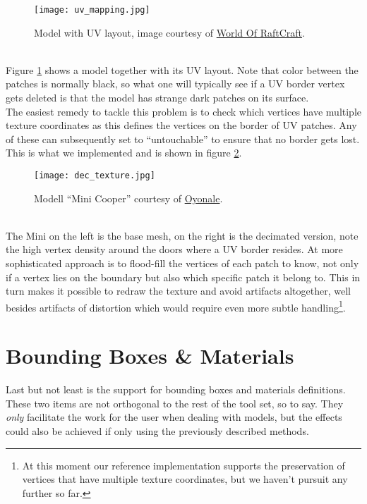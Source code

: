 \begin{figure}[htb]
\center
\texttt{[image: uv\_mapping.jpg]}
\caption{Model with UV layout, image courtesy of \href{http://blogs.gscept.com/2008/sg2/index.php/page/2/index.html}{World Of RaftCraft}.}
\label{fig:uv_mapping}
\end{figure}\\
Figure \ref{fig:uv_mapping} shows a model together with its UV layout.
Note that color between the patches is normally black, so what one will typically see if a UV border vertex gets deleted is that the model has strange dark patches on its surface.\\
The easiest remedy to tackle this problem is to check which vertices have multiple texture coordinates as this defines the vertices on the border of UV patches.
Any of these can subsequently set to ``untouchable'' to ensure that no border gets lost.
This is what we implemented and is shown in figure \ref{fig:dec_texture}.
\begin{figure}[htb]
\center
\texttt{[image: dec\_texture.jpg]}
\caption{Modell ``Mini Cooper'' courtesy of \href{http://www.oyonale.com}{Oyonale}.}
\label{fig:dec_texture}
\end{figure}\\
The Mini on the left is the base mesh, on the right is the decimated version, note the high vertex density around the doors where a UV border resides.
At more sophisticated approach is to flood-fill the vertices of each patch to know, not only if a vertex lies on the boundary but also which specific patch it belong to.
This in turn makes it possible to redraw the texture and avoid artifacts altogether, well besides artifacts of distortion which would require even more subtle handling\footnote{ At this moment our reference implementation supports the preservation of vertices that have multiple texture coordinates, but we haven't pursuit any further so far.}. 


\section{Bounding Boxes \& Materials}
\label{topstoc43}

Last but not least is the support for bounding boxes and materials definitions.
These two items are not orthogonal to the rest of the tool set, so to say.
They \textit{only} facilitate the work for the user when dealing with models, but the effects could also be achieved if only using the previously described methods.

